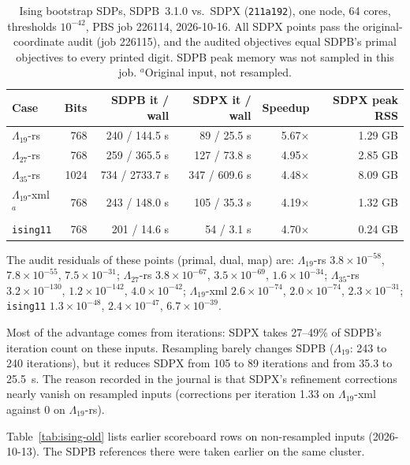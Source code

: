 \documentclass[11pt]{article}
\newcommand{\code}[1]{\texttt{#1}}
\begin{document}
\begin{table}[t]
\centering
\caption{Ising bootstrap SDPs, SDPB~3.1.0 vs.\ SDPX (\code{211a192}), one
node, 64 cores, thresholds $10^{-42}$, PBS job 226114, 2026-10-16. All SDPX
points pass the original-coordinate audit (job 226115), and the audited
objectives equal SDPB's primal objectives to every printed digit. SDPB peak
memory was not sampled in this job. $^{a}$Original input, not resampled.}
\label{tab:ising-sdpb}
\begin{tabular}{lrrrrr}
\toprule
Case & Bits & SDPB it / wall & SDPX it / wall & Speedup & SDPX peak RSS \\
\midrule
$\Lambda_{19}$-rs & 768 & 240 / 144.5 s & 89 / 25.5 s & 5.67$\times$ & 1.29 GB \\
$\Lambda_{27}$-rs & 768 & 259 / 365.5 s & 127 / 73.8 s & 4.95$\times$ & 2.85 GB \\
$\Lambda_{35}$-rs & 1024 & 734 / 2733.7 s & 347 / 609.6 s & 4.48$\times$ & 8.09 GB \\
$\Lambda_{19}$-xml$^{a}$ & 768 & 243 / 148.0 s & 105 / 35.3 s & 4.19$\times$ & 1.32 GB \\
\code{ising11} & 768 & 201 / 14.6 s & 54 / 3.1 s & 4.70$\times$ & 0.24 GB \\
\bottomrule
\end{tabular}
\end{table}

The audit residuals of these points (primal, dual, map) are: $\Lambda_{19}$-rs
$3.8\times10^{-58}$, $7.8\times10^{-55}$, $7.5\times10^{-31}$;
$\Lambda_{27}$-rs $3.8\times10^{-67}$, $3.5\times10^{-69}$, $1.6\times10^{-34}$;
$\Lambda_{35}$-rs $3.2\times10^{-130}$, $1.2\times10^{-142}$,
$4.0\times10^{-42}$; $\Lambda_{19}$-xml $2.6\times10^{-74}$,
$2.0\times10^{-74}$, $2.3\times10^{-31}$; \code{ising11} $1.3\times10^{-48}$,
$2.4\times10^{-47}$, $6.7\times10^{-39}$.

Most of the advantage comes from iterations: SDPX takes 27--49\% of SDPB's
iteration count on these inputs. Resampling barely changes SDPB ($\Lambda_{19}$:
243 to 240 iterations), but it reduces SDPX from 105 to 89 iterations and from
35.3 to 25.5~s. The reason recorded in the journal is that SDPX's refinement
corrections nearly vanish on resampled inputs (corrections per iteration
1.33 on $\Lambda_{19}$-xml against 0 on $\Lambda_{19}$-rs).

Table~\ref{tab:ising-old} lists earlier scoreboard rows on non-resampled
inputs (2026-10-13). The SDPB references there were taken earlier on the same
cluster.
\end{document}
